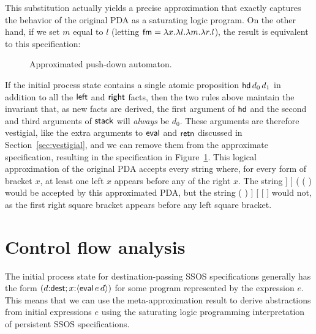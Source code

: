 \smallskip
{}
\smallskip

\noindent This substitution actually yields a precise approximation
that exactly captures the behavior of the original PDA as a saturating
logic program. On the other hand, if we set $m$ equal to $l$ 
(letting ${\sf fm} = \lambda x. \lambda l. \lambda m. \lambda r. l$), 
the result is equivalent to this specification:

\smallskip
{}
\smallskip

\begin{figure}
\caption{Approximated push-down automaton.}
\label{fig:pda-pers-approx2}
\end{figure}

If the initial process state contains a single atomic proposition
${\sf hd}\,d_0\,d_1$ in addition to all the ${\sf left}$ and ${\sf
  right}$ facts, then the two rules above maintain the invariant that,
as new facts are derived, the first argument of ${\sf hd}$ and the
second and third arguments of ${\sf stack}$ will {\it always} be
$d_0$.  These arguments are therefore vestigial, like the extra
arguments to ${\sf eval}$ and ${\sf retn}$ discussed in
Section~\ref{sec:vestigial}, and we can remove them from the
approximate specification, resulting in the specification in
Figure~\ref{fig:pda-pers-approx2}. This logical approximation of the
original PDA accepts every string where, for every form of bracket
$x$, at least one left $x$ appears before any of the right $x$. The
string {\sf [ ] ] ] ( ( )} would be accepted by this approximated PDA,
but the string {\sf ( ) ] [ [ ]} would not, as the first right square
bracket appears before any left square bracket.


\section{Control flow analysis}
\label{sec:0cfa}

The initial process state for destination-passing SSOS specifications
generally has the form $(d{:}{\sf dest}; x{:}\langle {{\sf eval}\,e\,d} \rangle)$
for some program represented by the expression $e$. This means that we
can use the meta-approximation result to derive abstractions from
initial expressions $e$ using the saturating logic programming
interpretation of persistent SSOS specifications.

